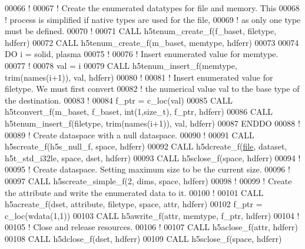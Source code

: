 \begin{DoxyCode}
00066   \textcolor{comment}{!}
00067   \textcolor{comment}{! Create the enumerated datatypes for file and memory.  This}
00068   \textcolor{comment}{! process is simplified if native types are used for the file,}
00069   \textcolor{comment}{! as only one type must be defined.}
00070   \textcolor{comment}{!}
00071   \textcolor{keyword}{CALL }h5tenum\_create\_f(f\_baset, filetype, hdferr)
00072   \textcolor{keyword}{CALL }h5tenum\_create\_f(m\_baset, memtype, hdferr)
00073 
00074   \textcolor{keywordflow}{DO} i = solid, plasma
00075      \textcolor{comment}{!}
00076      \textcolor{comment}{! Insert enumerated value for memtype.}
00077      \textcolor{comment}{!}
00078      val = i
00079      \textcolor{keyword}{CALL }h5tenum\_insert\_f(memtype, trim(names(i+1)), val, hdferr)
00080      \textcolor{comment}{!}
00081      \textcolor{comment}{! Insert enumerated value for filetype.  We must first convert}
00082      \textcolor{comment}{! the numerical value val to the base type of the destination.}
00083      \textcolor{comment}{!}
00084      f\_ptr = c\_loc(val)
00085      \textcolor{keyword}{CALL }h5tconvert\_f(m\_baset, f\_baset, int(1,size\_t), f\_ptr, hdferr)
00086      \textcolor{keyword}{CALL }h5tenum\_insert\_f(filetype, trim(names(i+1)), val, hdferr)
00087 \textcolor{keywordflow}{  ENDDO}
00088   \textcolor{comment}{!}
00089   \textcolor{comment}{! Create dataspace with a null dataspace.}
00090   \textcolor{comment}{!}
00091   \textcolor{keyword}{CALL }h5screate\_f(h5s\_null\_f, space, hdferr)
00092   \textcolor{keyword}{CALL }h5dcreate\_f(\hyperlink{structfile}{file}, dataset, h5t\_std\_i32le, space, dset, hdferr)
00093   \textcolor{keyword}{CALL }h5sclose\_f(space, hdferr)
00094   \textcolor{comment}{!}
00095   \textcolor{comment}{! Create dataspace.  Setting maximum size to be the current size.}
00096   \textcolor{comment}{!}
00097   \textcolor{keyword}{CALL }h5screate\_simple\_f(2, dims, space, hdferr)
00098   \textcolor{comment}{!}
00099   \textcolor{comment}{! Create the attribute and write the enumerated data to it.}
00100   \textcolor{comment}{!}
00101   \textcolor{keyword}{CALL }h5acreate\_f(dset, attribute, filetype, space, attr, hdferr)
00102   f\_ptr = c\_loc(wdata(1,1))
00103   \textcolor{keyword}{CALL }h5awrite\_f(attr, memtype, f\_ptr, hdferr)
00104   \textcolor{comment}{!}
00105   \textcolor{comment}{! Close and release resources.}
00106   \textcolor{comment}{!}
00107   \textcolor{keyword}{CALL }h5aclose\_f(attr, hdferr)
00108   \textcolor{keyword}{CALL }h5dclose\_f(dset, hdferr)
00109   \textcolor{keyword}{CALL }h5sclose\_f(space, hdferr)

\end{DoxyCode}
